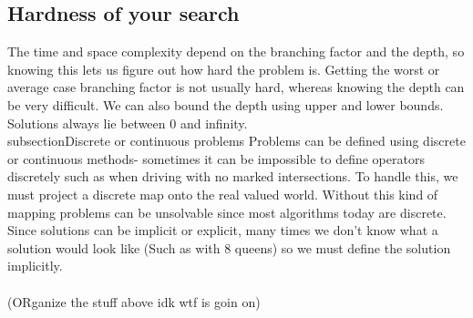 \documentclass{chezarticle}
\begin{document}
\subsection{Hardness of your search}
The time and space complexity depend on the branching factor and the depth, so knowing this lets us figure out how hard the problem is. Getting the worst or average case branching factor is not usually hard, whereas knowing the depth can be very difficult. We can also bound the depth using upper and lower bounds.
\\
Solutions always lie between 0 and infinity. 
\\subsection{Discrete or continuous problems}
Problems can be defined using discrete or continuous methods- sometimes it can be impossible to define operators discretely such as when driving with no marked intersections. To handle this, we must project a discrete map onto the real valued world. Without this kind of mapping problems can be unsolvable since most algorithms today are discrete.\\
Since solutions can be implicit or explicit, many times we don't know what a solution would look like (Such as with 8 queens) so we must define the solution implicitly.
\\
\\
(ORganize the stuff above idk wtf is goin on)
\\
\\
\
\end{document}
